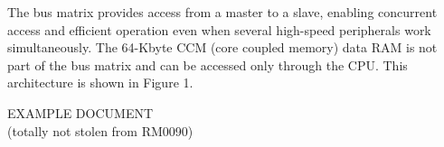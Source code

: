 \noindent The bus matrix provides access from a master to a slave, enabling concurrent access and 
efficient operation even when several high-speed peripherals work simultaneously. 
The 64-Kbyte CCM (core coupled memory) data RAM is not part of the bus matrix and can be 
accessed only through the CPU. This architecture is shown in Figure 1.

\vfill{}
\begin{center}
EXAMPLE DOCUMENT \\ \small (totally not stolen from RM0090)
\end{center}
\vfill{}